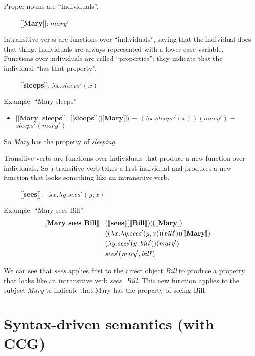 \documentclass[11pt,letterpaper]{article}
\newcommand{\sem}[1]{\mbox{[\hspace{-1.25px}[{\bf #1}]\hspace{-1.5px}]}}
\begin{document}
Proper nouns are ``individuals''.  

~~~~ \sem{Mary}: $\textit{mary}'$

Intransitive verbs are functions over ``individuals'', saying that the individual does that thing.  Individuals are always represented with a lower-case variable.  Functions over individuals are called ``properties''; they indicate that the individual ``has that property''.

~~~~ \sem{sleeps}: $\lambda x.\textit{sleeps}'(x)$

Example: ``Mary sleeps''

\begin{itemize}
  \item[] \sem{Mary sleeps}: \sem{sleeps}(\sem{Mary}) = $(\lambda x.\textit{sleeps}'(x))(\textit{mary}')$ 
                                                      = $\textit{sleeps}'(\textit{mary}')$
\end{itemize}

So \textit{Mary} has the property of \textit{sleeping}.

Transitive verbs are functions over individuals that produce a new function over individuals.  So a transitive verb takes a first individual and produces a new function that looks something like an intransitive verb.

~~~~ \sem{sees}:~ $\lambda x.\lambda y.\textit{sees}'(y,x)$

Example: ``Mary sees Bill''
  \begin{align*}
     \sem{Mary sees Bill}:~ & (\sem{sees}(\sem{Bill}))(\sem{Mary})  \\
                            & ((\lambda x.\lambda y.\textit{sees}'(y,x))(\textit{bill}'))(\sem{Mary}) \\
                            & (\lambda y.\textit{sees}'(y,\textit{bill}'))(\textit{mary}') \\
                            & \textit{sees}'(\textit{mary}',\textit{bill}')
  \end{align*}

We can see that \textit{sees} applies first to the direct object \textit{Bill} to produce a property that looks like an intransitive verb \textit{sees\_Bill}.  This new function applies to the subject \textit{Mary} to indicate that Mary has the property of seeing Bill.


\section{Syntax-driven semantics (with CCG)}
\end{document}
